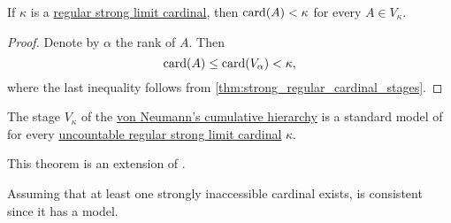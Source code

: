 \begin{corollary}\label{thm:strong_regular_cardinal_stage_cardinality}
  If \( \kappa \) is a \hyperref[rem:strongly_inaccessible_cardinal]{regular strong limit cardinal}, then \( \operatorname{card}(A) < \kappa \) for every \( A \in V_\kappa \).
\end{corollary}
\begin{proof}
  Denote by \( \alpha \) the rank of \( A \). Then
  \begin{equation*}
    \operatorname{card}(A) \leq \operatorname{card}(V_\alpha) < \kappa,
  \end{equation*}
  where the last inequality follows from \cref{thm:strong_regular_cardinal_stages}.
\end{proof}

\begin{theorem}\label{thm:cumulative_hierarchy_model_of_zfc}
  The stage \( V_\kappa \) of the \hyperref[def:cumulative_hierarchy]{von Neumann's cumulative hierarchy} is a standard model of  for every \hyperref[rem:strongly_inaccessible_cardinal]{uncountable regular strong limit cardinal} \( \kappa \).
\end{theorem}
\begin{comments}
  \item This theorem is an extension of .
  \item Assuming that at least one strongly inaccessible cardinal exists,  is consistent since it has a model.
\end{comments}
